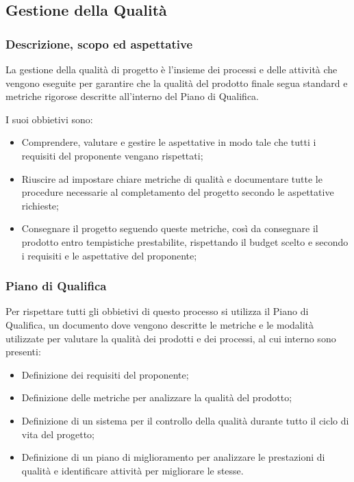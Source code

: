 \pagebreak %
\subsection{Gestione della Qualità}

\subsubsection{Descrizione, scopo ed aspettative}
La gestione della qualità di progetto è l'insieme dei processi e delle attività che vengono eseguite per garantire che la qualità del prodotto finale 
segua standard e metriche rigorose descritte all'interno del Piano di Qualifica.

I suoi obbietivi sono:
\begin{itemize}
    \item Comprendere, valutare e gestire le aspettative in modo tale che tutti i requisiti del proponente vengano rispettati;
    \item Riuscire ad impostare chiare metriche di qualità e documentare tutte le procedure necessarie al completamento del progetto secondo le aspettative richieste;
    \item Consegnare il progetto seguendo queste metriche, così da consegnare il prodotto entro tempistiche prestabilite, rispettando il budget scelto e secondo i requisiti e le aspettative del proponente;
\end{itemize}
\subsubsection{Piano di Qualifica}

Per rispettare tutti gli obbietivi di questo processo si utilizza il Piano di Qualifica, un documento dove vengono descritte le metriche e le modalità utilizzate per valutare la qualità dei prodotti e dei processi, 
al cui interno sono presenti:

\begin{itemize}
    \item Definizione dei requisiti del proponente;
    \item Definizione delle metriche per analizzare la qualità del prodotto;
    \item Definizione di un sistema per il controllo della qualità durante tutto il ciclo di vita del progetto;
    \item Definizione di un piano di miglioramento per analizzare le prestazioni di qualità e identificare attività per migliorare le stesse.
\end{itemize}

